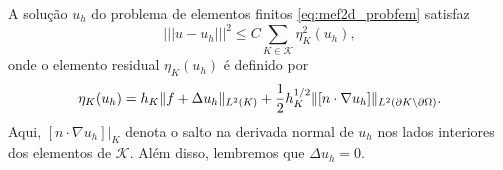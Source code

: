 \begin{teo}
  A solução $u_h$ do problema de elementos finitos \eqref{eq:mef2d_probfem} satisfaz
  \begin{equation}
    |||u-u_h|||^2 \leq C\sum_{K\in\mathcal{K}} \eta_K^2(u_h),
  \end{equation}
onde o elemento residual $\eta_K(u_h)$ é definido por
\begin{equation}
  \eta_K(u_h) = h_K\|f + \Delta u_h\|_{L^2(K)} + \frac{1}{2}h_K^{1/2}\|[n\cdot\nabla u_h]\|_{L^2(\partial K\setminus\partial \Omega)}.
\end{equation}
Aqui, $[n\cdot\nabla u_h]|_K$ denota o salto na derivada normal de $u_h$ nos lados interiores dos elementos de $\mathcal{K}$. Além disso, lembremos que $\Delta u_h = 0$.
\end{teo}
